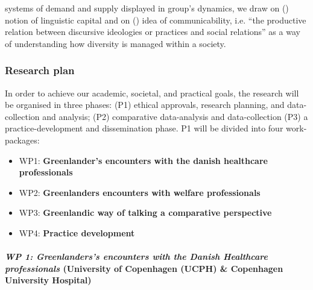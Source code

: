 \documentclass[twocolumn, serif, rga, authordate]{jote-article}
\begin{document}
systems of demand and supply displayed in group's dynamics, we draw on  (\citeyear{Bourdieu1991}) notion of linguistic capital and on  (\citeyear{Briggs2005}) idea of communicability, i.e. ``the productive relation between discursive ideologies or practices and social relations'' as a way of understanding how diversity is managed within a society.


\subsubsection*{Research plan}


In order to achieve our academic, societal, and practical goals, the research will be organised in three phases: (P1) ethical approvals, research planning, and data-collection and analysis; (P2) comparative data-analysis and data-collection (P3) a practice-development and dissemination phase. P1 will be divided into four work-packages:

\begin{itemize}
\item WP1: \textbf{Greenlander's encounters with the danish healthcare professionals}


\item WP2:
\textbf{Greenlanders encounters with welfare professionals}


\item WP3:
\textbf{Greenlandic way of talking a comparative perspective}


\item WP4:
\textbf{Practice development}
        \end{itemize}


\paragraph{\emph{WP 1: Greenlanders's encounters with the Danish Healthcare professionals} (University of Copenhagen (UCPH) \& Copenhagen University Hospital)}
\end{document}
